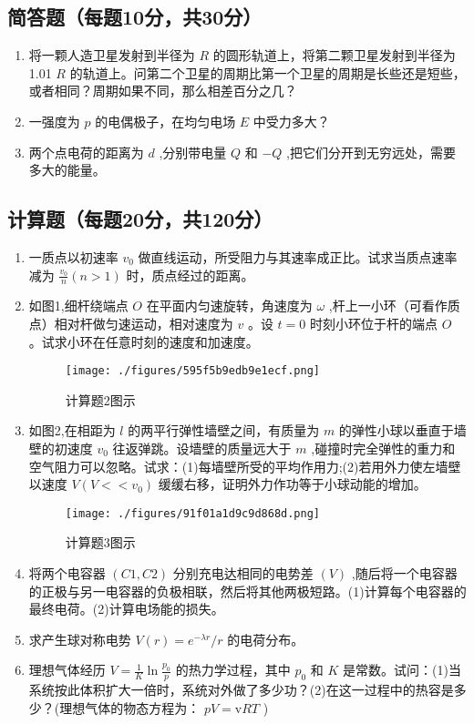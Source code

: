 

\subsection{ 简答题（每题10分，共30分）}
\begin{enumerate}
\item 将一颗人造卫星发射到半径为 $R$ 的圆形轨道上，将第二颗卫星发射到半径为1.01 $R$ 的轨道上。问第二个卫星的周期比第一个卫星的周期是长些还是短些，或者相同？周期如果不同，那么相差百分之几？

\item 一强度为 $p$ 的电偶极子，在均匀电场 $E$ 中受力多大？

\item 两个点电荷的距离为 $d$ ,分别带电量 $Q$ 和 $-Q$ ,把它们分开到无穷远处，需要多大的能量。
\end{enumerate}
\subsection{计算题（每题20分，共120分）}
\begin{enumerate}
\item 一质点以初速率 $v_0$ 做直线运动，所受阻力与其速率成正比。试求当质点速率减为 $\frac{v_0}{n}(n>1)$ 时，质点经过的距离。

\item 如图1,细杆绕端点 $O$ 在平面内匀速旋转，角速度为 $\omega$ ,杆上一小环（可看作质点）相对杆做匀速运动，相对速度为 $v$ 。设 $t=0$ 时刻小环位于杆的端点 $O$ 。试求小环在任意时刻的速度和加速度。\\
\begin{figure}[ht]
\centering
\texttt{[image: ./figures/595f5b9edb9e1ecf.png]}
\caption{计算题2图示} \label{fig_USTC13_1}
\end{figure}

\item 如图2,在相距为 $l$ 的两平行弹性墙壁之间，有质量为 $m$ 的弹性小球以垂直于墙壁的初速度 $v_0$ 往返弹跳。设墙壁的质量远大于 $m$ ,碰撞时完全弹性的重力和空气阻力可以忽略。试求：(1)每墙壁所受的平均作用力;(2)若用外力使左墙壁以速度 $V(V<<v_0)$ 缓缓右移，证明外力作功等于小球动能的增加。\\
\begin{figure}[ht]
\centering
\texttt{[image: ./figures/91f01a1d9c9d868d.png]}
\caption{计算题3图示} \label{fig_USTC13_2}
\end{figure}

\item 将两个电容器 $(C1,C2)$ 分别充电达相同的电势差 $(V)$ ,随后将一个电容器的正极与另一电容器的负极相联，然后将其他两极短路。(1)计算每个电容器的最终电荷。(2)计算电场能的损失。

\item 求产生球对称电势 $V(r)=e^{-\lambda r}/r$ 的电荷分布。

\item 理想气体经历 $V=\frac{1}{K} \ln \frac{p_{0}}{p}$ 的热力学过程，其中 $p_0$ 和 $K$ 是常数。试问：(1)当系统按此体积扩大一倍时，系统对外做了多少功？(2)在这一过程中的热容是多少？(理想气体的物态方程为： $pV=\mathrm v RT$ )
\end{enumerate}
